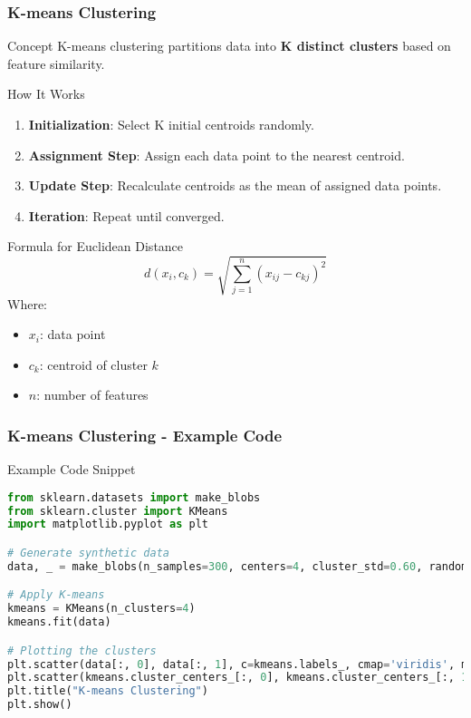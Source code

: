 \documentclass[aspectratio=169]{beamer}
\begin{document}
\begin{frame}[fragile]
    \frametitle{K-means Clustering}
    \begin{block}{Concept}
        K-means clustering partitions data into \textbf{K distinct clusters} based on feature similarity.
    \end{block}

    \begin{block}{How It Works}
        \begin{enumerate}
            \item \textbf{Initialization}: Select K initial centroids randomly.
            \item \textbf{Assignment Step}: Assign each data point to the nearest centroid.
            \item \textbf{Update Step}: Recalculate centroids as the mean of assigned data points.
            \item \textbf{Iteration}: Repeat until converged.
        \end{enumerate}
    \end{block}

    \begin{block}{Formula for Euclidean Distance}
        \begin{equation}
            d(x_i, c_k) = \sqrt{\sum_{j=1}^{n} (x_{ij} - c_{kj})^2}
        \end{equation}
        Where:
        \begin{itemize}
            \item $x_i$: data point
            \item $c_k$: centroid of cluster $k$
            \item $n$: number of features
        \end{itemize}
    \end{block}
\end{frame}

\begin{frame}[fragile]
    \frametitle{K-means Clustering - Example Code}
    \begin{block}{Example Code Snippet}
    \begin{lstlisting}[language=Python]
from sklearn.datasets import make_blobs
from sklearn.cluster import KMeans
import matplotlib.pyplot as plt

# Generate synthetic data
data, _ = make_blobs(n_samples=300, centers=4, cluster_std=0.60, random_state=0)

# Apply K-means
kmeans = KMeans(n_clusters=4)
kmeans.fit(data)

# Plotting the clusters
plt.scatter(data[:, 0], data[:, 1], c=kmeans.labels_, cmap='viridis', marker='o')
plt.scatter(kmeans.cluster_centers_[:, 0], kmeans.cluster_centers_[:, 1], c='red', s=200, alpha=0.75)
plt.title("K-means Clustering")
plt.show()
    \end{lstlisting}
    \end{block}
\end{frame}
\end{document}
